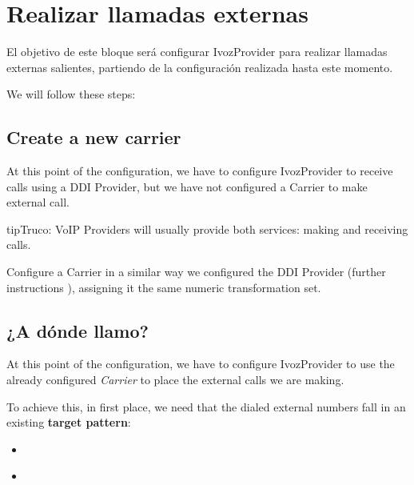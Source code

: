 \documentclass[letterpaper,10pt,spanish]{sphinxmanual}
\begin{document}
\chapter{Realizar llamadas externas}
\label{getting_started/external_outgoing_calls/index:making-external-calls}\label{getting_started/external_outgoing_calls/index::doc}
El objetivo de este bloque será configurar IvozProvider para realizar llamadas externas salientes, partiendo de la configuración realizada hasta este momento.

We will follow these steps:


\section{Create a new carrier}
\label{getting_started/external_outgoing_calls/create_carrier:create-a-new-carrier}\label{getting_started/external_outgoing_calls/create_carrier::doc}
At this point of the configuration, we have to configure IvozProvider to receive
calls using a DDI Provider, but we have not configured a Carrier to make external call.

\begin{notice}{tip}{Truco:}
VoIP Providers will usually provide both services: making and receiving calls.
\end{notice}

Configure a Carrier in a similar way we configured the DDI Provider (further instructions {\hyperref[administration_portal/brand/providers/carriers:carriers]{}}),
assigning it the same numeric transformation set.


\section{¿A dónde llamo?}
\label{getting_started/external_outgoing_calls/where_do_i_call::doc}\label{getting_started/external_outgoing_calls/where_do_i_call:where-do-i-call}
At this point of the configuration, we have to configure IvozProvider to use the
already configured \emph{Carrier} to place the external calls we are making.

To achieve this, in first place, we need that the dialed external numbers fall
in an existing \textbf{target pattern}:
\begin{itemize}
\item {} 
{\hyperref[administration_portal/brand/routing/routing_patterns:id1]{}}

\item {} 
{\hyperref[administration_portal/brand/routing/routing_patterns_groups:routing\string-pattern\string-groups]{}}

\end{itemize}
\end{document}
